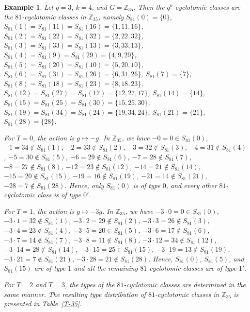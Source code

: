 \documentclass[pdflatex,sn-mathphys-num]{sn-jnl}%
\theoremstyle{thmstyleone}%
\theoremstyle{thmstyletwo}%
\newtheorem{example}{Example}%
\theoremstyle{thmstylethree}%
\newcommand{\Z}{\mathbb{Z}}
\begin{document}
\begin{example}\label{ex:z35-q3k4}
Let $q=3$, $k=4$, and $G=\Z_{35}$. Then the $q^k$-cyclotomic classes are the $81$-cyclotomic classes in $\Z_{35}$, namely
$
S_{81}(0)=\{0\}$, $
S_{81}(1)=S_{81}(11)=S_{81}(16)=\{1,11,16\}$,
$S_{81}(2)=S_{81}(22)=S_{81}(32)=\{2,22,32\}$, $
S_{81}(3)=S_{81}(33)=S_{81}(13)=\{3,33,13\}$, $
S_{81}(4)=S_{81}(9)=S_{81}(29)=\{4,9,29\}$, $
S_{81}(5)=S_{81}(20)=S_{81}(10)=\{5,20,10\}$, $
S_{81}(6)=S_{81}(31)=S_{81}(26)=\{6,31,26\}$, $
S_{81}(7)=\{7\}$, $
S_{81}(8)=S_{81}(18)=S_{81}(23)=\{8,18,23\}$, $
S_{81}(12)=S_{81}(27)=S_{81}(17)=\{12,27,17\}$, $
S_{81}(14)=\{14\}$, $
S_{81}(15)=S_{81}(25)=S_{81}(30)=\{15,25,30\}$, $
S_{81}(19)=S_{81}(34)=S_{81}(24)=\{19,34,24\}$, $
S_{81}(21)=\{21\}$, $
S_{81}(28)=\{28\}$.

 

For $T=0$, the action is $g\mapsto -g$. In $\Z_{35}$,  we have  $
-0=0 \in S_{81}(0)$, 
$ -1=34 \notin S_{81}(1)$,  
$ -2=33 \notin S_{81}(2) $,  
$ -3=32 \notin S_{81}(3)$,  
$ -4=31 \notin S_{81}(4)$, 
$ -5=30 \notin S_{81}(5)$, 
 $
-6=29 \notin S_{81}(6)$, 
$ -7=28 \notin S_{81}(7)$,  
$ -8=27 \notin S_{81}(8)$,  
$ -12=23 \notin S_{81}(12)$,  
$ -14=21 \notin S_{81}(14)$,  
$ -15=20 \notin S_{81}(15)$, 
$-19=16 \notin S_{81}(19)$,  
$ -21=14 \notin S_{81}(21)$,  
$ -28=7\notin S_{81}(28)$. 
Hence, only $S_{81}(0)$ is of type $0$, and every other $81$-cyclotomic class is of type $0'$.

For $T=1$, the action is $g\mapsto -3g$. In $\Z_{35}$, we have 
  $
-3\cdot 0=0 \in S_{81}(0)$,  
$ -3\cdot 1=32 \notin S_{81}(1) $,  
$ -3\cdot 2=29 \notin S_{81}(2)$,  
$ -3\cdot 3=26  \notin S_{81}(3)$,  
$ -3\cdot 4=23 \notin S_{81}(4)$,
 $ 
-3\cdot 5=20 \in S_{81}(5)$,  
$ -3\cdot 6=17 \notin S_{81}(6)$,  
$ -3\cdot 7=14  \notin S_{81}(7)$,  
$ -3\cdot 8=11  \notin S_{81}(8)$,  
$ -3\cdot 12=34 \notin S_{81}(12)$, 
 $
-3\cdot 14=28  \notin S_{81}(14)$,  
$ -3\cdot 15=25 \in S_{81}(15)$,  
$ -3\cdot 19=13 \notin S_{81}(19)$,  
$ -3\cdot 21=7 \notin S_{81}(21)$,  
$ -3\cdot 28=21 \notin S_{81}(28)
 $.
Hence, 
  $S_{81}(0)$, $S_{81}(5)$, and $S_{81}(15)$ are of type $1$ and all the remaining $81$-cyclotomic classes are of type $1'$.

For $T=2$ and $T=3$, the types of the $81$-cyclotomic classes are determined in the same manner. The resulting type distribution of $81$-cyclotomic classes in $\Z_{35}$ is presented in Table~\ref{T-35}.


\end{example}
\end{document}
